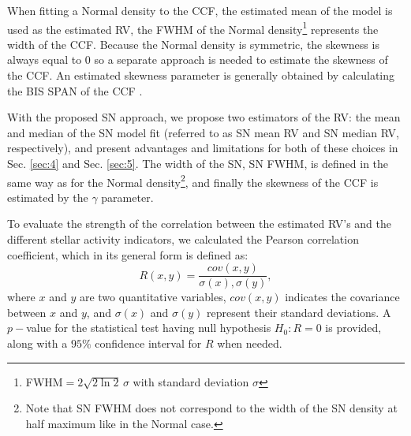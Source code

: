 \documentclass[11pt, oneside]{article}
\begin{document}

When fitting a Normal density to the CCF, the estimated mean of the model is used as the estimated RV, the FWHM of the Normal density\footnote{FWHM$=2\sqrt{2\ln2}\,\sigma$ with standard deviation $\sigma$} represents the width of the CCF.
Because the Normal density is symmetric, the skewness is always equal to 0 so a separate approach is needed to estimate the skewness of the CCF.
An estimated skewness parameter is generally obtained by calculating the BIS SPAN of the CCF \citep[see Sect. \ref{intro}, and e.g.][]{Queloz-2001}. 
%

With the proposed SN approach, we propose two estimators of the RV: the mean and median of the SN model fit (referred to as SN mean RV and SN median RV, respectively), and present advantages and limitations for both of these choices in Sec. \ref{sec:4} and Sec. \ref{sec:5}. 
The width of the SN, SN FWHM, is defined in the same way as for the Normal density\footnote{Note that SN FWHM does not correspond to the width of the SN density at half maximum like in the Normal case.}, and finally the skewness of the CCF is estimated by the $\gamma$ parameter.

To evaluate the strength of the correlation between the estimated RV's and the different stellar activity indicators, we calculated the Pearson correlation coefficient, which in its general form is defined as:
%
\begin{equation}
R (x,y)= \frac{cov(x,y)}{\sigma(x),\sigma(y)},
\label{eq:Pearson:corr}
\end{equation}
%
where $x$ and $y$ are two quantitative variables, $cov(x,y)$ indicates the covariance between $x$ and $y$, and $\sigma(x)$ and $\sigma(y)$ represent their standard deviations.  A $p-$value for the statistical test having null hypothesis $H_{0}: R=0$ is provided, along with a $95\%$ confidence interval for $R$ when needed.
\end{document}
